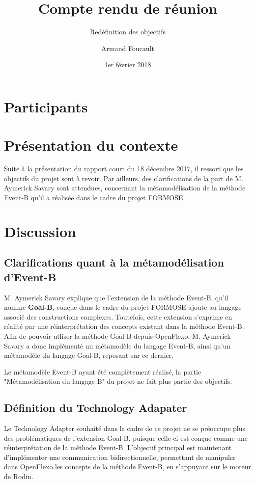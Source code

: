 \documentclass{article}
\author{Armand Foucault}
\date{1er février 2018}
\title{Compte rendu de réunion}
\subtitle{Redéfinition des objectifs}
\begin{document}
\imtammMaketitle

\section*{Participants}

\begin{imtammActorList}
\item \actorasavary
\item \actorjcbach
\item \actorafoucaul
\end{imtammActorList}


\section*{Présentation du contexte}
Suite à la présentation du rapport court du 18 décembre 2017, il ressort que les objectifs du projet sont à revoir.
Par ailleurs, des clarifications de la part de M. Aymerick Savary sont attendues, concernant la métamodélisation de la méthode Event-B qu'il a réalisée dans le cadre du projet FORMOSE.


\section*{Discussion}

\subsection*{Clarifications quant à la métamodélisation d'Event-B}
M. Aymerick Savary explique que l'extension de la méthode Event-B, qu'il nomme \textbf{Goal-B}, conçue dans le cadre du projet FORMOSE ajoute au langage associé des constructions complexes.
Toutefois, cette extension s'exprime en réalité par une réinterprétation des concepts existant dans la méthode Event-B.
Afin de pouvoir utliser la méthode Goal-B depuis OpenFlexo, M. Aymerick Savary a donc implémenté un métamodèle du langage Event-B, ainsi qu'un métamodèle du langage Goal-B, reposant sur ce dernier.

Le métamodèle Event-B ayant été complètement réalisé, la partie "Métamodélisation du langage B" du projet ne fait plus partie des objectifs.

\subsection*{Définition du Technology Adapater}
Le Technology Adapter souhaité dans le cadre de ce projet ne se préoccupe plus des problématiques de l'extension Goal-B, puisque celle-ci est conçue comme une réinterprétation de la méthode Event-B.
L'objectif principal est maintenant d'implémenter une communication bidirectionnelle, permettant de manipuler dans OpenFlexo les concepts de la méthode Event-B, en s'appuyant sur le moteur de Rodin.
\end{document}
